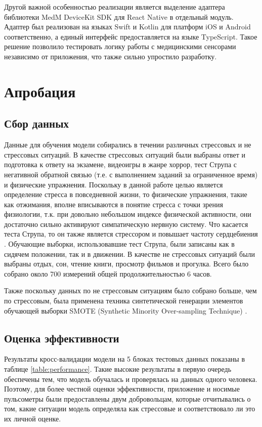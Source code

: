 \documentclass[14pt]{matmex-diploma-custom}
\begin{document}
Другой важной особенностью реализации является выделение адаптера библиотеки
MedM DeviceKit SDK для React Native в отдельный модуль. Адаптер был реализован
на языках Swift и Kotlin для платформ iOS и Android соответственно, а единый
интерфейс предоставляется на языке TypeScript. Такое решение позволило
тестировать логику работы с медицинскими сенсорами независимо от приложения, что
также сильно упростило разработку.

\section{Апробация}
\subsection{Сбор данных}
Данные для обучения модели собирались в течении различных стрессовых и не
стрессовых ситуаций. В качестве стрессовых ситуаций были выбраны ответ и
подготовка к ответу на экзамене, видеоигры в жанре хоррор, тест Струпа с
негативной обратной связью (т.е. с выполнением заданий за ограниченное время) и
физические упражнения. Поскольку в данной работе целью является определение
стресса в повседневной жизни, то физические упражнения, такие как отжимания,
вполне вписываются в понятие стресса с точки зрения физиологии, т.к. при
довольно небольшом индексе физической активности, они достаточно сильно
активируют симпатическую нервную систему. Что касается теста Струпа, то он также
является стрессором и повышает частоту сердцебиения \cite{article:stroop}.
Обучающие выборки, использовавшие тест Струпа, были записаны как в сидячем
положении, так и в движении. В качестве не стрессовых ситуаций были выбраны
отдых, сон, чтение книги, просмотр фильмов и прогулка. Всего было собрано около
700 измерений общей продолжительностью 6 часов.

Также поскольку данных по не стрессовым ситуациям было собрано больше, чем по
стрессовым, была применена техника синтетической генерации элементов обучающей
выборки SMOTE (Synthetic Minority Over-sampling Technique) \cite{article:smote}.

\subsection{Оценка эффективности}
Результаты кросс-валидации модели на 5 блоках тестовых данных показаны в таблице
\ref{table:performance}. Такие высокие результаты в первую очередь обеспечены
тем, что модель обучалась и проверялась на данных одного человека. Поэтому, для
более честной оценки эффективности, приложение и носимые пульсометры были
предоставлены двум добровольцам, которые отчитывались о том, какие ситуации
модель определяла как стрессовые и соответствовало ли это их личной оценке.
\end{document}
